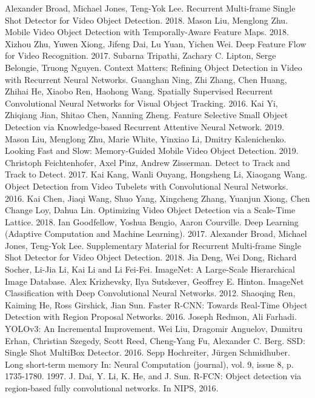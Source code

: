 \documentclass[conference]{IEEEtran}
\begin{document}
\begin{thebibliography}{00}
 Alexander Broad, Michael Jones, Teng-Yok Lee. Recurrent Multi-frame Single Shot Detector for Video Object Detection. 2018.
 Mason Liu, Menglong Zhu. Mobile Video Object Detection with Temporally-Aware Feature Maps. 2018.
 Xizhou Zhu, Yuwen Xiong, Jifeng Dai, Lu Yuan, Yichen Wei. Deep Feature Flow for Video Recognition. 2017.
 Subarna Tripathi, Zachary C. Lipton, Serge Belongie, Truong Nguyen. Context Matters: Refining Object Detection in Video with Recurrent Neural Networks.
 Guanghan Ning, Zhi Zhang, Chen Huang, Zhihai He, Xiaobo Ren, Haohong Wang. Spatially Supervised Recurrent Convolutional Neural Networks for Visual Object Tracking. 2016.
 Kai Yi, Zhiqiang Jian, Shitao Chen, Nanning Zheng. Feature Selective Small Object Detection via Knowledge-based Recurrent Attentive Neural Network. 2019.
 Mason Liu, Menglong Zhu, Marie White, Yinxiao Li, Dmitry Kalenichenko. Looking Fast and Slow: Memory-Guided Mobile Video Object Detection. 2019.
 Christoph Feichtenhofer, Axel Pinz, Andrew Zisserman. Detect to Track and Track to Detect. 2017.
 Kai Kang, Wanli Ouyang, Hongsheng Li, Xiaogang Wang. Object Detection from Video Tubelets with Convolutional Neural Networks. 2016.
 Kai Chen, Jiaqi Wang, Shuo Yang, Xingcheng Zhang, Yuanjun Xiong, Chen Change Loy, Dahua Lin. Optimizing Video Object Detection via a Scale-Time Lattice. 2018.
 Ian Goodfellow, Yoshua Bengio, Aaron Courville. Deep Learning (Adaptive Computation and Machine Learning). 2017.
 Alexander Broad, Michael Jones, Teng-Yok Lee. Supplementary Material for Recurrent Multi-frame Single Shot Detector for Video Object Detection. 2018.
 Jia Deng, Wei Dong, Richard Socher, Li-Jia Li, Kai Li and Li Fei-Fei. ImageNet: A Large-Scale Hierarchical Image Database. 
 Alex Krizhevsky, Ilya Sutskever, Geoffrey E. Hinton. ImageNet Classification with Deep Convolutional Neural Networks. 2012.
 Shaoqing Ren, Kaiming He, Ross Girshick, Jian Sun. Faster R-CNN: Towards Real-Time Object Detection with Region Proposal Networks. 2016. 
 Joseph Redmon, Ali Farhadi. YOLOv3: An Incremental Improvement.
 Wei Liu, Dragomir Anguelov, Dumitru Erhan, Christian Szegedy, Scott Reed, Cheng-Yang Fu, Alexander C. Berg. SSD: Single Shot MultiBox Detector. 2016.
 Sepp Hochreiter, Jürgen Schmidhuber. Long short-term memory In: Neural Computation (journal), vol. 9, issue 8, p. 1735-1780. 1997.
 J. Dai, Y. Li, K. He, and J. Sun. R-FCN: Object detection via
region-based fully convolutional networks. In NIPS, 2016.
\end{thebibliography}
\vspace{12pt}
\end{document}
